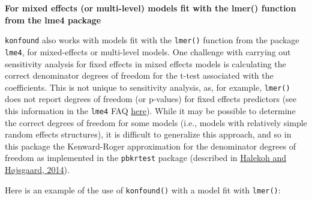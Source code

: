 \textbf{For mixed effects (or multi-level) models fit with the lmer()
function from the lme4 package}

\texttt{konfound} also works with models fit with the \texttt{lmer()}
function from the package \texttt{lme4}, for mixed-effects or
multi-level models. One challenge with carrying out sensitivity analysis
for fixed effects in mixed effects models is calculating the correct
denominator degrees of freedom for the t-test associated with the
coefficients. This is not unique to sensitivity analysis, as, for
example, \texttt{lmer()} does not report degrees of freedom (or
p-values) for fixed effects predictors (see this information in the
\texttt{lme4} FAQ
\href{http://bbolker.github.io/mixedmodels-misc/glmmFAQ.html\#why-doesnt-lme4-display-denominator-degrees-of-freedomp-values-what-other-options-do-i-have}{here}).
While it may be possible to determine the correct degrees of freedom for
some models (i.e., models with relatively simple random effects
structures), it is difficult to generalize this approach, and so in this
package the Kenward-Roger approximation for the denominator degrees of
freedom as implemented in the \texttt{pbkrtest} package (described in
\href{https://www.jstatsoft.org/htaccess.php?volume=59\&type=i\&issue=09\&paper=true}{Halekoh
and Højsgaard, 2014}).

Here is an example of the use of \texttt{konfound()} with a model fit
with \texttt{lmer()}:

